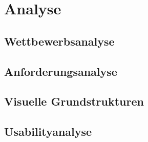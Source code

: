 \chapter{Analyse}
\label{ch:analysis}

\section{Wettbewerbsanalyse}
\label{sec:competitionanalysis}


\section{Anforderungsanalyse}
\label{sec:requirementanalysis}


\section{Visuelle Grundstrukturen}
\label{sec:visualstructure}


\section{Usabilityanalyse}
\label{sec:usabilityanalysis}
